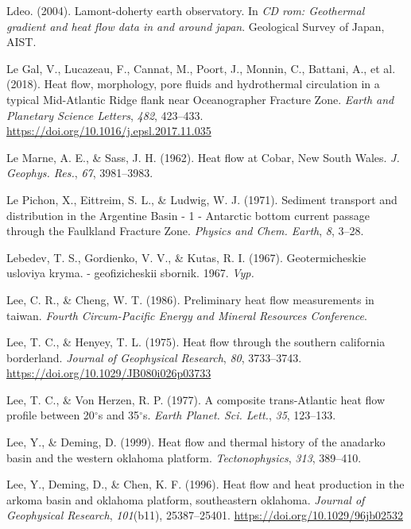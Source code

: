 \begin{CSLReferences}{1}{1}
\leavevmode{}%
Ldeo. (2004). Lamont-doherty earth observatory. In \emph{CD rom: Geothermal gradient and heat flow data in and around japan}. Geological Survey of Japan, AIST.

\leavevmode{}%
Le Gal, V., Lucazeau, F., Cannat, M., Poort, J., Monnin, C., Battani, A., et al. (2018). Heat flow, morphology, pore fluids and hydrothermal circulation in a typical {Mid-Atlantic Ridge} flank near {Oceanographer Fracture Zone}. \emph{Earth and Planetary Science Letters}, \emph{482}, 423--433. \url{https://doi.org/10.1016/j.epsl.2017.11.035}

\leavevmode{}%
Le Marne, A. E., \& Sass, J. H. (1962). Heat flow at {Cobar, New South Wales}. \emph{J. Geophys. Res.}, \emph{67}, 3981--3983.

\leavevmode{}%
Le Pichon, X., Eittreim, S. L., \& Ludwig, W. J. (1971). Sediment transport and distribution in the {Argentine Basin} - 1 - {Antarctic} bottom current passage through the {Faulkland Fracture Zone}. \emph{Physics and Chem. Earth}, \emph{8}, 3--28.

\leavevmode{}%
Lebedev, T. S., Gordienko, V. V., \& Kutas, R. I. (1967). Geotermicheskie usloviya kryma. - geofizicheskii sbornik. 1967. \emph{Vyp.}

\leavevmode{}%
Lee, C. R., \& Cheng, W. T. (1986). Preliminary heat flow measurements in taiwan. \emph{Fourth Circum-Pacific Energy and Mineral Resources Conference}.

\leavevmode{}%
Lee, T. C., \& Henyey, T. L. (1975). Heat flow through the southern california borderland. \emph{Journal of Geophysical Research}, \emph{80}, 3733--3743. \url{https://doi.org/10.1029/JB080i026p03733}

\leavevmode{}%
Lee, T. C., \& Von Herzen, R. P. (1977). A composite {trans-Atlantic} heat flow profile between 20\(^\circ\)s and 35\(^\circ\)s. \emph{Earth Planet. Sci. Lett.}, \emph{35}, 123--133.

\leavevmode{}%
Lee, Y., \& Deming, D. (1999). Heat flow and thermal history of the anadarko basin and the western oklahoma platform. \emph{Tectonophysics}, \emph{313}, 389--410.

\leavevmode{}%
Lee, Y., Deming, D., \& Chen, K. F. (1996). Heat flow and heat production in the arkoma basin and oklahoma platform, southeastern oklahoma. \emph{Journal of Geophysical Research}, \emph{101}(b11), 25387--25401. \url{https://doi.org/10.1029/96jb02532}


\end{CSLReferences}
